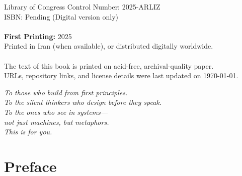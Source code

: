 \documentclass[12pt, oneside, openany]{book}
\begin{document}
	\begin{flushleft}
	{\small
		Library of Congress Control Number: 2025-ARLIZ\\
		ISBN: Pending (Digital version only)\\
		\\
		\textbf{First Printing:} 2025\\
		Printed in Iran (when available), or distributed digitally worldwide.\\
		\\
		The text of this book is printed on acid-free, archival-quality paper.\\
		URLs, repository links, and license details were last updated on \today.
	}
	\end{flushleft}
\clearpage

\thispagestyle{empty}
\vspace*{6cm}
\begin{center}
	\emph{
		To those who build from first principles.\\
		To the silent thinkers who design before they speak.\\
		To the ones who see in systems—\\
		not just machines, but metaphors.\\
		This is for you.}
\end{center}

\pagestyle{empty}
	\chapter{Preface}
	\thispagestyle{empty}
\end{document}
